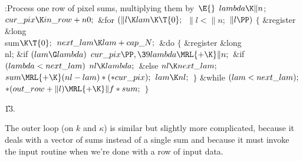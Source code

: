 \B{}:Process one row of pixel sums, multiplying them by~\X${}%
\E{}$\6
$\\{lambda}\K\|n{}$;\5
${}\\{cur\_pix}\K\\{in\_row}+\\{n0};{}$\6
\&{for} ${}(\|l\K\\{lam}\K\T{0};{}$ ${}\|l<\|n;{}$ ${}\|l\PP){}$\5
${}\{{}$\5
\1\&{register} \&{long} \\{sum}${}\K\T{0};{}$\7
${}\\{next\_lam}\K\\{lam}+\\{cap\_N};{}$\6
\&{do}\5
${}\{{}$\5
\1\&{register} \&{long} \\{nl};\7
\&{if} ${}(\\{lam}\G\\{lambda}){}$\1\5
${}\\{cur\_pix}\PP,\39\\{lambda}\MRL{+{\K}}\|n;{}$\2\6
\&{if} ${}(\\{lambda}<\\{next\_lam}){}$\1\5
${}\\{nl}\K\\{lambda};{}$\2\6
\&{else}\1\5
${}\\{nl}\K\\{next\_lam};{}$\2\6
${}\\{sum}\MRL{+{\K}}(\\{nl}-\\{lam})*({*}\\{cur\_pix});{}$\6
${}\\{lam}\K\\{nl};{}$\6
\4${}\}{}$\5
\2\5
\&{while} ${}(\\{lam}<\\{next\_lam});{}$\6
${}{*}(\\{out\_row}+\|l)\MRL{+{\K}}\|f*\\{sum};{}$\6
\4${}\}{}$\2\par
\U13.\fi

The outer loop (on $k$ and $\kappa$) is similar but slightly more
complicated, because it deals with a vector of sums instead of a single
sum and because it must invoke the input routine when we're done
with a row of input data.


